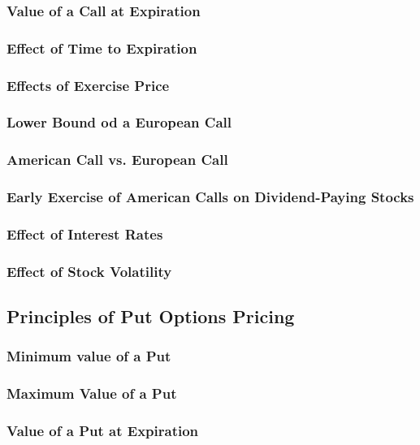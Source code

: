 \documentclass{book}
\theoremstyle{definition}
\theoremstyle{remark}
\begin{document}
        \subsubsection{Value of a Call at Expiration}
        \subsubsection{Effect of Time to Expiration}
        \subsubsection{Effects of Exercise Price}
        \subsubsection{Lower Bound od a European Call}
        \subsubsection{American Call vs. European Call}
        \subsubsection{Early Exercise of American Calls on Dividend-Paying Stocks}
        \subsubsection{Effect of Interest Rates}
        \subsubsection{Effect of Stock Volatility}
    
    \subsection{Principles of Put Options Pricing}
        \subsubsection{Minimum value of a Put}
        \subsubsection{Maximum Value of a Put}
        \subsubsection{Value of a Put at Expiration}
\end{document}
